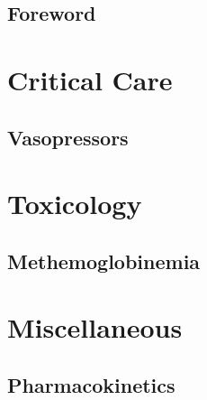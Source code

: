 \documentclass[10pt,openany]{book}
\begin{document}
	




\renewcommand{\contentsname}{\color{mainColor} Contents}
\tableofcontents

\chapter*{Foreword}



\part{Critical Care}

\begin{refsection}
\chapter{Vasopressors} \label{ch:vasopressors}

\end{refsection}

\part{Toxicology}

\begin{refsection}
\chapter{Methemoglobinemia} \label{ch:methemoglobinemia}

\end{refsection}


\part{Miscellaneous}

\begin{refsection}
\chapter{Pharmacokinetics} \label{ch:pk}

\end{refsection}

	
\end{document}
